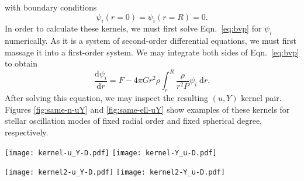 \documentclass[twocolumn,twocolappendix]{aastex6}
\newcommand{\ddra}[1]{\frac{\text{d} #1}{\text{d}r}}
\begin{document}
with boundary conditions
\begin{equation} \label{eq:bcs1}
    \psi_i(r=0) = \psi_i(r=R) = 0.
\end{equation}
In order to calculate these kernels, we must first solve Eqn.\ \ref{eq:bvp} for $\psi_i$ numerically. As it is a system of second-order differential equations, we must first massage it into a first-order system. We may integrate both sides of Eqn.\ \ref{eq:bvp} to obtain 
\begin{equation}
    \ddra{\psi_i} = F - 4\pi G r^2 \rho \int_{r}^R \frac{\rho}{r^2 P} \psi_i \; \text{d}r.
\end{equation}
After solving this equation, we may inspect the resulting $(u, Y)$ kernel pair. %
Figures \ref{fig:same-n-uY} and \ref{fig:same-ell-uY} show examples of these kernels for stellar oscillation modes of fixed radial order and fixed spherical degree, respectively. 



\begin{figure*}%
    \texttt{[image: kernel-u\_Y-D.pdf]}%
    \texttt{[image: kernel-Y\_u-D.pdf]}
    \caption{Kernel functions for the squared isothermal sound speed and helium abundance $K^{(u, Y)}$ (left) and $K^{(Y, u)}$ (right) as a function of fractional radius for oscillation modes of a solar model with the same radial order but different spherical degree. Notice that $K^{(Y, u)}$ is very small ($0 < K^{(Y,u)} < 0.01$) in the interior $r/R < 0.9$.} %
    \label{fig:same-n-uY} 
\end{figure*}
\begin{figure*}%
    \texttt{[image: kernel2-u\_Y-D.pdf]}%
    \texttt{[image: kernel2-Y\_u-D.pdf]}
    \caption{Kernel functions $K^{(u, Y)}$ (left) and $K^{(Y, u)}$ (right) as a function of radius for oscillation modes of a solar model with the same spherical degree but different radial order.}%
    \label{fig:same-ell-uY} 
\end{figure*}



\end{document}
